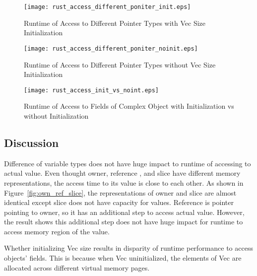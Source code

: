 \begin{figure}[htb]
    \texttt{[image: rust\_access\_different\_poniter\_init.eps]}
    \caption{Runtime of Access to Different Pointer Types with Vec Size Initialization}
    \label{fig:rustaccessinit}
\end{figure}

\begin{figure}[htb]
    \texttt{[image: rust\_access\_different\_poniter\_noinit.eps]}
    \caption{Runtime of Access to Different Pointer Types without Vec Size Initialization}
    \label{fig:rustaccessnoinit}
\end{figure}

\begin{figure}[htb]
    \texttt{[image: rust\_access\_init\_vs\_noint.eps]}
    \caption{Runtime of Access to Fields of Complex Object with Initialization vs without Initialization}
    \label{fig:init_vs_noinit}
\end{figure}

\subsection{Discussion}
\label{sec:history}
Difference of variable types does not have huge impact to runtime of accessing to actual value.
Even thought owner, reference , and slice have different memory representations, the access time to its value is 
close to each other. As shown in Figure~\ref{fig:own_ref_slice}, the representations of owner and slice are almost identical except slice does not have capacity for values.
Reference is pointer pointing to owner, so it has an additional step to access actual value. 
However, the result shows this additional step does not have huge impact for runtime to access memory region of the value.

Whether initializing Vec size results in disparity of runtime performance to access objects' fields. 
This is because when Vec uninitialized, the elements of Vec are allocated across different virtual memory pages.

